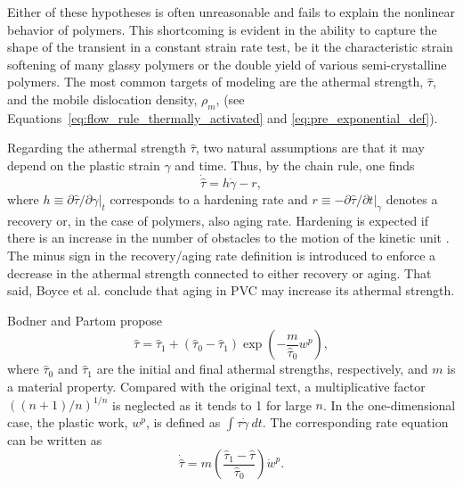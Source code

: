 Either of these hypotheses is often unreasonable and fails to explain the nonlinear behavior of polymers.
This shortcoming is evident in the ability to capture the shape of the transient in a constant strain rate test, be it the characteristic strain softening of many glassy polymers or the double yield of various semi-crystalline polymers.
The most common targets of modeling are the athermal strength, $\hat \tau$, and the mobile dislocation density, $\rho_m$, (see Equations~\eqref{eq:flow_rule_thermally_activated} and \eqref{eq:pre_exponential_def}).

Regarding the athermal strength $\hat \tau$, two natural assumptions are that it may depend on the plastic strain $\gamma$ and time.
Thus, by the chain rule, one finds
\begin{equation}
  \dot{\hat \tau} = h \dot\gamma - r,
\end{equation}
where $h\equiv \partial \hat \tau/\partial \gamma |_t$ corresponds to a hardening rate and $r\equiv - \partial \hat \tau/\partial t|_\gamma$ denotes a recovery or, in the case of polymers, also aging rate.
Hardening is expected if there is an increase in the number of obstacles to the motion of the kinetic unit \citep{kocks1975thermodynamics, hasanConstitutiveModelNonlinear1995}.
The minus sign in the recovery/aging rate definition is introduced to enforce a decrease in the athermal strength connected to either recovery or aging.
That said, Boyce et al. \citep{boyceLargeInelasticDeformation1988} conclude that aging in PVC may increase its athermal strength.

Bodner and Partom \citep{bodnerConstitutiveEquationsElasticViscoplastic1975} propose
\begin{equation}
  \hat \tau = {\hat \tau}_1 + ({\hat \tau}_0 - {\hat \tau}_1)\exp\left(-\frac{m}{{\hat \tau}_0}w^p\right),
\end{equation}
where ${\hat \tau}_0$ and ${\hat \tau}_1$ are the initial and final athermal strengths, respectively, and $m$ is a material property.
Compared with the original text, a multiplicative factor $((n+1)/n)^{1/n}$ is neglected as it tends to 1 for large $n$.
In the one-dimensional case, the plastic work, $w^p$, is defined as $\int \tau\dot \gamma\ dt$.
The corresponding rate equation can be written as \citep{zairiElastoviscoplasticConstitutiveEquations2007}
\begin{equation}
  \label{eq:bodner_partom_rate_eq}
  \dot{\hat \tau} = m\left(\frac{{\hat \tau}_1 - {\hat \tau}}{{\hat \tau}_0}\right)\dot w^p.
\end{equation}

